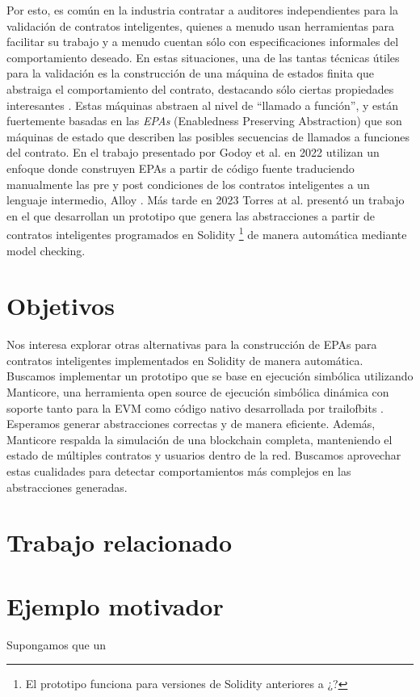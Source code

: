 Por esto, es común en la industria contratar a auditores independientes para la validación de contratos inteligentes,
quienes a menudo usan herramientas para facilitar su trabajo y a menudo cuentan sólo con especificaciones informales del comportamiento deseado.
En estas situaciones, una de las tantas técnicas útiles para la validación es  la construcción de una máquina de estados finita que abstraiga el comportamiento del contrato, destacando sólo ciertas propiedades interesantes \cite{predicate-abstraction-for-smart-contract-validation}.
Estas máquinas abstraen al nivel de ``llamado a función'', y están fuertemente basadas en las \textit{EPAs} (Enabledness Preserving Abstraction) \cite{de-caso-epa} que son máquinas de estado que describen las posibles secuencias de llamados a funciones del contrato.
En el trabajo presentado por Godoy et al. en 2022 \cite{predicate-abstraction-for-smart-contract-validation} utilizan un enfoque donde construyen EPAs a partir de código fuente traduciendo manualmente las pre y post condiciones de los contratos inteligentes a un lenguaje intermedio, Alloy \cite{alloy}.
Más tarde en 2023 Torres at al. \cite{torres} presentó un trabajo en el que desarrollan un prototipo que genera las abstracciones a partir de contratos inteligentes programados en Solidity \footnote{El prototipo funciona para versiones de Solidity anteriores a ¿?} de manera automática mediante model checking.

\section{Objetivos}

Nos interesa explorar otras alternativas para la construcción de EPAs para contratos inteligentes implementados en Solidity de manera automática.
Buscamos implementar un prototipo que se base en ejecución simbólica utilizando Manticore, una herramienta open source de ejecución simbólica dinámica con soporte tanto para la EVM como código nativo desarrollada por trailofbits \cite{manticore}.
Esperamos generar abstracciones correctas y de manera eficiente.
Además, Manticore respalda la simulación de una blockchain completa, manteniendo el estado de múltiples contratos y usuarios dentro de la red.
Buscamos aprovechar estas cualidades para detectar comportamientos más complejos en las abstracciones generadas.

\section{Trabajo relacionado}


\section{Ejemplo motivador}

Supongamos que un